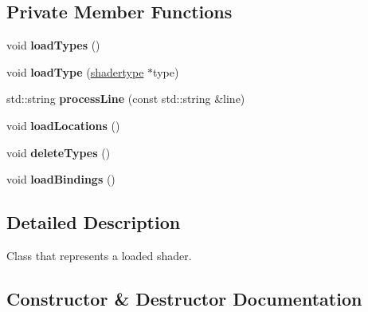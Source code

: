 \subsection*{Private Member Functions}
\begin{DoxyCompactItemize}
\item 
\mbox{\label{classflounder_1_1shader_a6e6e2fb4699edf3e31a2db8cc0537d54}} 
void {\bfseries load\+Types} ()
\item 
\mbox{\label{classflounder_1_1shader_a6b9dd723ad226438a710cac8303841e5}} 
void {\bfseries load\+Type} (\hyperlink{classflounder_1_1shadertype}{shadertype} $\ast$type)
\item 
\mbox{\label{classflounder_1_1shader_ad80001da433e7afbd646fe2d19ac8b4a}} 
std\+::string {\bfseries process\+Line} (const std\+::string \&line)
\item 
\mbox{\label{classflounder_1_1shader_a01e50af930469630a051f8bcf9a74897}} 
void {\bfseries load\+Locations} ()
\item 
\mbox{\label{classflounder_1_1shader_a12948c1607867de569f1cd596c923623}} 
void {\bfseries delete\+Types} ()
\item 
\mbox{\label{classflounder_1_1shader_ababc32f14fa38c2c3e0337c5537b1dcd}} 
void {\bfseries load\+Bindings} ()
\end{DoxyCompactItemize}


\subsection{Detailed Description}
Class that represents a loaded shader. 



\subsection{Constructor \& Destructor Documentation}
\mbox{\label{classflounder_1_1shader_ae8c052148333a4c06a4dd31b56b072cf}} 
